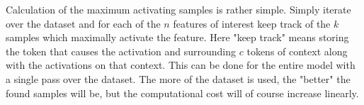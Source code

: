 \documentclass[../main.tex]{subfiles}
\begin{document}
Calculation of the maximum activating samples is rather simple.
Simply iterate over the dataset 
and for each of the $n$ features of interest 
keep track of the $k$ samples which maximally activate the feature.
Here "keep track" means storing the token that causes the activation and 
surrounding $c$ tokens of context along with the activations on that context.
This can be done for the entire model with a single pass over the dataset.
The more of the dataset is used, the "better" the found samples will be, 
but the computational cost will of course increase linearly.

\end{document}
